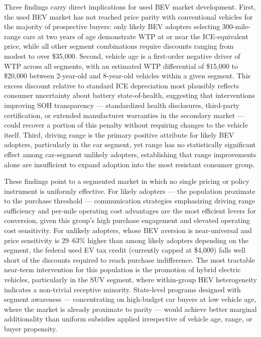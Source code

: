 \documentclass[a4paper,fleqn]{cas-sc}   %
\begin{document}
Three findings carry direct implications for used BEV market development. First, the used BEV market has not reached price parity with conventional vehicles for the majority of prospective buyers: only likely BEV adopters selecting 300-mile-range cars at two years of age demonstrate WTP at or near the ICE-equivalent price, while all other segment combinations require discounts ranging from modest to over \$35{,}000. Second, vehicle age is a first-order negative driver of WTP across all segments, with an estimated WTP differential of \$15{,}000 to \$20{,}000 between 2-year-old and 8-year-old vehicles within a given segment. This excess discount relative to standard ICE depreciation most plausibly reflects consumer uncertainty about battery state-of-health, suggesting that interventions improving SOH transparency --- standardized health disclosures, third-party certification, or extended manufacturer warranties in the secondary market --- could recover a portion of this penalty without requiring changes to the vehicle itself. Third, driving range is the primary positive attribute for likely BEV adopters, particularly in the car segment, yet range has no statistically significant effect among car-segment unlikely adopters, establishing that range improvements alone are insufficient to expand adoption into the most resistant consumer group.

These findings point to a segmented market in which no single pricing or policy instrument is uniformly effective. For likely adopters --- the population proximate to the purchase threshold --- communication strategies emphasizing driving range sufficiency and per-mile operating cost advantages are the most efficient levers for conversion, given this group's high purchase engagement and elevated operating cost sensitivity. For unlikely adopters, whose BEV aversion is near-universal and price sensitivity is 29--63\% higher than among likely adopters depending on the segment, the federal used EV tax credit (currently capped at \$4{,}000) falls well short of the discounts required to reach purchase indifference. The most tractable near-term intervention for this population is the promotion of hybrid electric vehicles, particularly in the SUV segment, where within-group HEV heterogeneity indicates a non-trivial receptive minority. State-level programs designed with segment awareness --- concentrating on high-budget car buyers at low vehicle age, where the market is already proximate to parity --- would achieve better marginal additionality than uniform subsidies applied irrespective of vehicle age, range, or buyer propensity.
\end{document}
